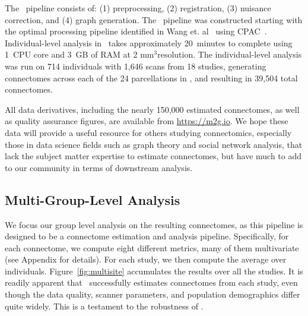 \documentclass[11pt]{article}
\begin{document}
The \ndmgf~pipeline consists of: (1) preprocessing, (2) registration, (3) nuisance correction, and (4) graph generation.
The \ndmgf~pipeline was constructed starting with the optimal processing pipeline identified in Wang et. al~\cite{discriminability} using CPAC~\cite{cpac}. 
Individual-level analysis in \ndmgf~takes approximately 20~minutes to complete using 1~CPU core and 3~GB of RAM at 2 mm$^3$resolution.
The individual-level analysis was run on 714 individuals with 1,646 scans from 18 studies, generating connectomes across each of the 24 parcellations in \ndmgd, and resulting in 39,504 total connectomes.

All data derivatives, including the nearly 150,000 estimated connectomes, as well as quality assurance figures, are available from \url{https://m2g.io}.  We hope these data will provide a useful resource for others studying connectomics, especially those in data science fields such as graph theory and social network analysis, that lack the subject matter expertise to estimate connectomes, but have much to add to our community in terms of downstream analysis.


\subsection{Multi-Group-Level Analysis}



We focus our group level analysis on the resulting connectomes, as this pipeline is designed to be a connectome estimation and analysis pipeline.  Specifically, for each connectome, we compute eight different metrics, many of them multivariate (see Appendix for details).  For each study, we then compute the average over individuals.  Figure~\ref{fig:multisite} accumulates the results over all the studies.  It is readily apparent that \ndmg~successfully estimates connectomes from each study, even though the data quality, scanner parameters, and population demographics differ quite widely.  This is a testament to the robustness of \ndmg.  

\end{document}
